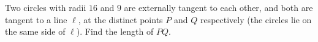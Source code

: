 Two circles with radii $16$ and $9$ are externally tangent to each other, and both are tangent to a line $\ell$, at the distinct points $P$ and $Q$ respectively (the circles lie on the same side of $\ell$). Find the length of $PQ$.
